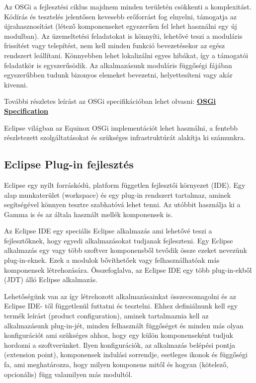 Az OSGi a fejlesztési ciklus majdnem minden területén csökkenti a komplexitást. Kódírás és tesztelés jelentősen kevesebb erőforrást fog elnyelni, támogatja az újrahasznosítást (létező komponenseket egyszerűen fel lehet használni egy új modulban). Az üzemeltetési feladatokat is könnyíti, lehetővé teszi a moduláris frissítést vagy telepítést, nem kell minden funkció bevezetésekor az egész rendszert leállítani. Könnyebben lehet lokalizálni egyes hibákat, így a támogatói feladatkör is egyszerűsödik. Az alkalmazásunk moduláris függőségi fájában egyszerűbben tudunk bizonyos elemeket bevezetni, helyettesíteni vagy akár kivenni.

További részletes leírást az OSGi specifikációban lehet olvasni:  \textbf{\href{https://www.osgi.org/developer/specifications/}{OSGi Specification}}

Eclipse világban az Equinox OSGi implementációt lehet használni, a fentebb részletezett szolgáltatásokat és szükséges infrastruktúrát alakítja ki számunkra.

\subsection{Eclipse Plug-in fejlesztés}

Eclipse egy nyílt forráskódú, platform független fejlesztői környezet (IDE). Egy alap munkaterület (workspace) és egy plug-in rendszert tartalmaz, aminek segítségével könnyen tesztre szabhatóvá lehet tenni. Az utóbbit használja ki a Gamma is és az általa használt mellék komponensek is. 

Az Eclipse IDE egy speciális Eclipse alkalmazás ami lehetővé teszi a fejlesztőknek, hogy egyedi alkalmazásokat tudjanak fejleszteni. Egy Eclipse alkalmazás egy vagy több szoftver komponensből tevődik össze ezeket nevezünk plug-in-eknek. Ezek a modulok bővíthetőek vagy felhasználhatóak más komponensek létrehozására. Összefoglalva, az Eclipse IDE egy több plug-in-ekből (JDT) álló Eclipse alkalmazás.

Lehetőségünk van az így létrehozott alkalmazásainkat összecsomagolni és az Eclipse IDE- től függetlenül futtatni és tesztelni.
Ehhez definiálnunk kell egy termék leírást (product configuration), aminek tartalmaznia kell az alkalmazásunk plug-in-jét, minden felhasznált függőséget és minden más olyan konfigurációt ami szükséges ahhoz, hogy egy külön komponenseként tudjuk hordozni a szoftverünket. Ilyen konfigurációk, az alkalmazás belépési pontja (extension point), komponensek indulási sorrendje, esetleges ikonok és függőségi fa, ami meghatározza, hogy milyen komponens mitől és hogyan (kötelező, opcionális) függ valamilyen más modultól.


